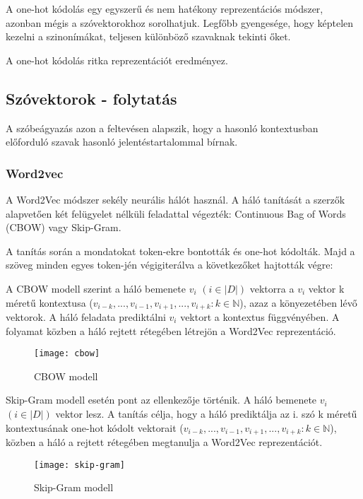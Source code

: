A one-hot kódolás egy egyszerű és nem hatékony reprezentációs módszer, azonban mégis a szóvektorokhoz sorolhatjuk. Legfőbb gyengesége, hogy képtelen kezelni a szinonímákat, teljesen különböző szavaknak tekinti őket.

\begin{note}
	A one-hot kódolás ritka reprezentációt eredményez.
\end{note}

\subsection*{Szóvektorok - folytatás}
A szóbeágyazás azon a feltevésen alapszik, hogy a hasonló kontextusban előforduló szavak hasonló jelentéstartalommal bírnak.

\subsubsection{Word2vec}
A Word2Vec módszer sekély neurális hálót használ. A háló tanítását a szerzők alapvetően két felügyelet nélküli feladattal végezték: Continuous Bag of Words (CBOW) vagy Skip-Gram.

A tanítás során a mondatokat token-ekre bontották és one-hot kódolták. Majd a szöveg minden egyes token-jén végigiterálva a következőket hajtották végre:

A CBOW modell szerint a háló bemenete $v_i$
$\left( i \in \left|D\right| \right)$ vektorra a $v_i$ vektor k méretű kontextusa ($v_{i-k},...,v_{i-1}, v_{i+1},..., v_{i+k} : k \in \mathbb{N}$), azaz a könyezetében lévő vektorok. A háló feladata prediktálni $v_i$ vektort a kontextus függvényében. A folyamat közben a háló rejtett rétegében létrejön a Word2Vec reprezentáció.

\begin{figure}[H]
	\centering
	\texttt{[image: cbow]}
	\caption{CBOW modell}
\end{figure}

Skip-Gram modell esetén pont az ellenkezője történik. A háló bemenete $v_i$
$\left( i \in \left|D\right| \right)$ vektor lesz. A tanítás célja, hogy a háló prediktálja az i. szó k méretű kontextusának one-hot kódolt vektorait ($v_{i-k},...,v_{i-1}, v_{i+1},..., v_{i+k} : k \in \mathbb{N}$), közben a háló a rejtett rétegében megtanulja a Word2Vec reprezentációt.

\begin{figure}[H]
	\centering
	\texttt{[image: skip-gram]}
	\caption{Skip-Gram modell}
\end{figure}

